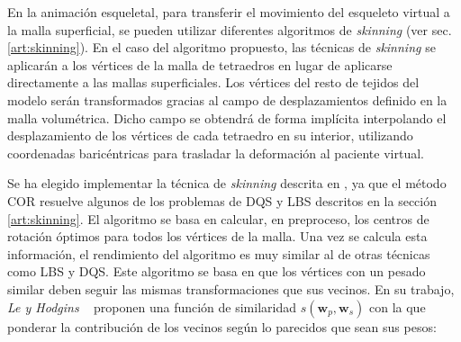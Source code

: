En la animación esqueletal, para transferir el movimiento del esqueleto virtual a la malla superficial, se pueden utilizar diferentes algoritmos de \emph{skinning} (ver sec. \ref{art:skinning}). %
En el caso del algoritmo propuesto, las técnicas de  \emph{skinning} se aplicarán a los vértices de la malla de tetraedros en lugar de aplicarse directamente a las mallas superficiales. Los vértices del resto de tejidos del modelo serán transformados gracias al campo de desplazamientos definido en la malla volumétrica. Dicho campo se obtendrá de forma implícita interpolando el desplazamiento de los vértices de cada tetraedro en su interior, utilizando coordenadas baricéntricas para trasladar la deformación al paciente virtual. 



Se ha elegido implementar la técnica de \emph{skinning} descrita en \cite{le2016real},  ya que el método \ac{COR} resuelve algunos de los problemas de \ac{DQS} y \ac{LBS} descritos en la sección \ref{art:skinning}. El algoritmo se basa en calcular, en preproceso, los centros de rotación óptimos para todos los vértices de la malla. %
Una vez se calcula esta información, el rendimiento del algoritmo es muy similar al de otras técnicas como \ac{LBS} y \ac{DQS}. %
Este algoritmo se basa en que los vértices con un pesado similar deben seguir las mismas transformaciones que sus vecinos. En su trabajo, \emph {Le y Hodgins} ~\cite{le2016real} proponen una función de similaridad  $s(\textbf{w}_p,\textbf{w}_s)$ con la que ponderar la contribución de los vecinos según lo parecidos que sean sus pesos:

